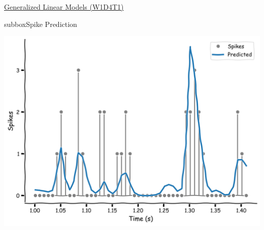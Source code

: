 \begin{textbox}{\href{https://compneuro.neuromatch.io/tutorials/W1D4_GeneralizedLinearModels/student/W1D4_Tutorial1.html}{Generalized Linear Models (W1D4T1)} }
\begin{subbox}{subbox}{Spike Prediction 
}

\centering
\includegraphics[scale=0.1]{Figures/GLM/GLMFigure4.png}
\end{subbox}
\end{textbox}
